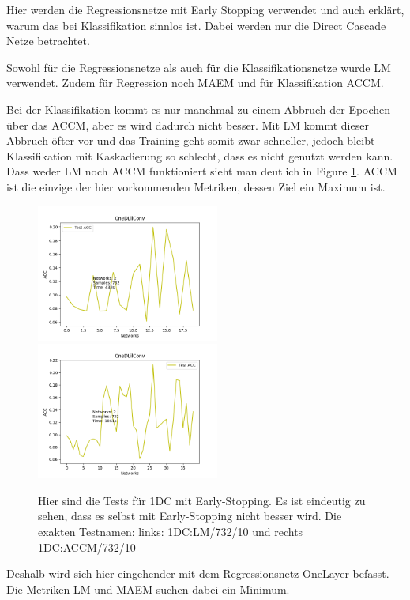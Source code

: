 Hier werden die Regressionsnetze mit Early Stopping verwendet und auch erklärt, warum das bei Klassifikation sinnlos ist. 
Dabei werden nur die Direct Cascade Netze betrachtet. 

Sowohl für die Regressionsnetze als auch für die Klassifikationsnetze wurde LM verwendet. 
Zudem für Regression noch MAEM und für Klassifikation ACCM. 

Bei der Klassifikation kommt es nur manchmal zu einem Abbruch der Epochen über das ACCM, aber es wird dadurch nicht besser. Mit LM kommt 
dieser Abbruch öfter vor und das Training geht somit 
zwar schneller, jedoch bleibt Klassifikation mit Kaskadierung so schlecht, dass es nicht genutzt werden kann. Dass weder LM noch ACCM 
funktioniert sieht man deutlich in Figure \ref{fig:1dconvmetrics}. ACCM ist die einzige der hier vorkommenden Metriken, dessen Ziel ein Maximum ist. 

\begin{figure}[htpb]
    \includegraphics[height=4.5cm]{../../Plots/ba_plots/earlystopping/lossmetric/1dconv_ts.png}
    \includegraphics[height=4.5cm]{../../Plots/ba_plots/earlystopping/intermetric/1dconv_ts.png}
    \caption{\label{fig:1dconvmetrics} 
    \small{Hier sind die Tests für 1DC mit Early-Stopping. Es ist eindeutig zu sehen, dass es selbst mit Early-Stopping nicht besser wird. 
    Die exakten Testnamen: links: 1DC:LM/732/10 und rechts 1DC:ACCM/732/10}}
\end{figure}

Deshalb wird sich hier eingehender mit dem Regressionsnetz OneLayer befasst. Die Metriken LM und MAEM suchen dabei ein Minimum. 

